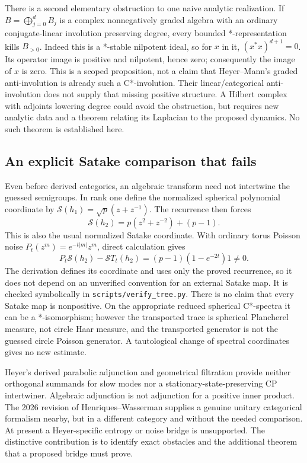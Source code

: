 \documentclass[11pt]{article}
\theoremstyle{remark}\newtheorem{remark}[definition]{Remark}
\begin{document}
There is a second elementary obstruction to one naive analytic realization.
If $B=\bigoplus_{j=0}^dB_j$ is a complex nonnegatively graded algebra with
an ordinary conjugate-linear involution preserving degree, every bounded
*-representation kills $B_{>0}$. Indeed this is a *-stable nilpotent ideal,
so for $x$ in it, $(x^*x)^{d+1}=0$. Its operator image is positive and
nilpotent, hence zero; consequently the image of $x$ is zero.
This is a scoped proposition, not a claim that Heyer--Mann's graded
anti-involution is already such a C*-involution. Their linear/categorical
anti-involution does not supply that missing positive structure. A Hilbert
complex with adjoints lowering degree could avoid the obstruction, but
requires new analytic data and a theorem relating its Laplacian to the
proposed dynamics. No such theorem is established here.

\subsection{An explicit Satake comparison that fails}
Even before derived categories, an algebraic transform need not intertwine
the guessed semigroups. In rank one define the normalized spherical
polynomial coordinate by
$\mathcal S(h_1)=\sqrt p(z+z^{-1})$.
The recurrence then forces
\[
 \mathcal S(h_2)=p(z^2+z^{-2})+(p-1).
\]
This is also the usual normalized Satake coordinate. With ordinary torus
Poisson noise $P_t(z^m)=e^{-t|m|}z^m$, direct calculation gives
\begin{equation}\label{eq:satake-defect}
 P_t\mathcal S(h_2)-\mathcal S T_t(h_2)
 =(p-1)(1-e^{-2t})1\ne0.
\end{equation}
The derivation defines its coordinate and uses only the proved recurrence,
so it does not depend on an unverified convention for an external Satake
map. It is checked symbolically in \texttt{scripts/verify\_tree.py}.
There is no claim that every Satake map is nonpositive. On the appropriate
reduced spherical C*-spectra it can be a *-isomorphism; however the transported
trace is spherical Plancherel measure, not circle Haar measure, and the
transported generator is not the guessed circle Poisson generator.
A tautological change of spectral coordinates gives no new estimate.

Heyer's derived parabolic adjunction and geometrical filtration provide
neither orthogonal summands for slow modes nor a stationary-state-preserving
CP intertwiner. Algebraic adjunction is not adjunction for a positive inner
product. The 2026 revision of Henriques--Wasserman supplies a genuine unitary
categorical formalism nearby, but in a different category and without the
needed comparison. At present a Heyer-specific entropy or noise bridge is
unsupported. The distinctive contribution is to identify exact obstacles
and the additional theorem that a proposed bridge must prove.
\end{document}
